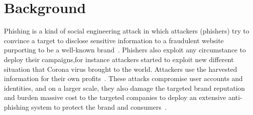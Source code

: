 \documentclass[letterpaper,twocolumn,10pt]{article}
\begin{document}



\section{Background}
Phishing is a kind of social engineering attack in which attackers (phishers) try to convince a target to disclose sensitive information to a fraudulent website purporting to be a well-known brand~\cite{dodge2007phishing,holz2009learning,mcgrath2008behind}. Phishers also exploit any circumstance to deploy their campaigns,for instance attackers started to exploit new different situation that Corona virus brought to the world\cite{bitaab2020scampandamic}.
Attackers use the harvested information for their own profits~\cite{sood2013crimeware,aleroud2017phishing}.
These attacks compromise user accounts and identities, and on a larger scale, they also damage the targeted brand reputation and burden massive cost to the targeted companies to deploy an extensive anti-phishing system to protect the brand and consumers~\cite{hong2012state}.
\end{document}
